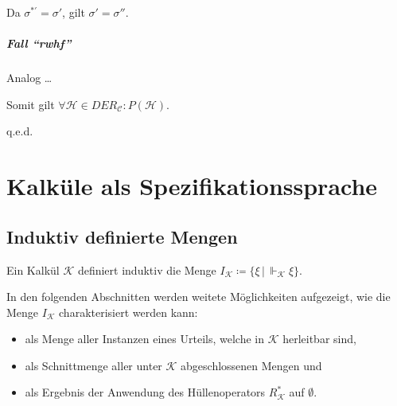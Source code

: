 \documentclass[a4paper, 11pt, accentcolor = tud3b]{tudreport}
\newcommand{\forwhich}{\ensuremath{{\,\vert\,}}}
\newcommand{\qed}{{\hfill q.e.d.}}
\begin{document}
					    Da $ \sigma ^ {*'} = \sigma' $, gilt $ \sigma' = \sigma'' $.
				    
				    \subparagraph{Fall \enquote{rwhf}}
					    Analog \dots
				    
				    Somit gilt $ \forall \mathcal{H} \in \textit{DER} _ \mathcal{C} : P(\mathcal{H}) $.
				    
				    \qed
	    
	    \section{Kalküle als Spezifikationssprache}
		    \subsection{Induktiv definierte Mengen}
			    Ein Kalkül $ \mathcal{K} $ definiert induktiv die Menge $ I _ \mathcal{K} \coloneqq \{ \xi \forwhich \Vdash _ \mathcal{K} \xi \} $.
			    
			    In den folgenden Abschnitten werden weitete Möglichkeiten aufgezeigt, wie die Menge $ I _ \mathcal{K} $ charakterisiert werden kann:
			    \begin{itemize}
			    	\item als Menge aller Instanzen eines Urteils, welche in $ \mathcal{K} $ herleitbar sind,
			    	\item als Schnittmenge aller unter $ \mathcal{K} $ abgeschlossenen Mengen und
			    	\item als Ergebnis der Anwendung des Hüllenoperators $ R _ \mathcal{K} ^ * $ auf $ \emptyset $.
			    \end{itemize}
		    
\end{document}
